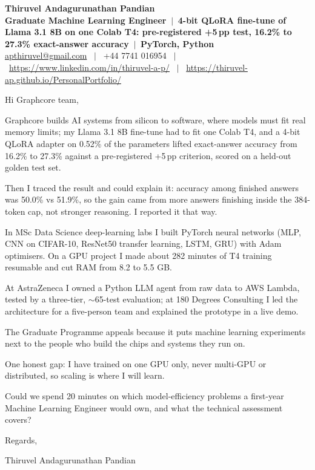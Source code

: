 \documentclass[11pt,a4paper]{article}
\begin{document}
\raggedright
\pagestyle{empty}

\begin{center}
    {\LARGE \color{linkblue} \textbf{Thiruvel Andagurunathan Pandian}}\\[0.2cm]
     {\color{headernavy}\small\textbf{Graduate Machine Learning Engineer \,$|$\, 4-bit QLoRA fine-tune of Llama 3.1 8B on one Colab T4: pre-registered +5\,pp test, 16.2\% to 27.3\% exact-answer accuracy \,$|$\, PyTorch, Python}}\\[0.2cm]
    \href{mailto:apthiruvel@gmail.com}{apthiruvel@gmail.com} \ $|$ \ +44 7741 016954 \ $|$ \
    \url{https://www.linkedin.com/in/thiruvel-a-p/} \ $|$ \
    \url{https://thiruvel-ap.github.io/PersonalPortfolio/}
\end{center}

\vspace{0.4cm}

\noindent
Hi Graphcore team,

Graphcore builds AI systems from silicon to software, where models must fit real memory limits; my Llama 3.1 8B fine-tune had to fit one Colab T4, and a 4-bit QLoRA adapter on 0.52\% of the parameters lifted exact-answer accuracy from 16.2\% to 27.3\% against a pre-registered +5\,pp criterion, scored on a held-out golden test set.

Then I traced the result and could explain it: accuracy among finished answers was 50.0\% vs 51.9\%, so the gain came from more answers finishing inside the 384-token cap, not stronger reasoning. I reported it that way.

In MSc Data Science deep-learning labs I built PyTorch neural networks (MLP, CNN on CIFAR-10, ResNet50 transfer learning, LSTM, GRU) with Adam optimisers. On a GPU project I made about 282 minutes of T4 training resumable and cut RAM from 8.2 to 5.5 GB.

At AstraZeneca I owned a Python LLM agent from raw data to AWS Lambda, tested by a three-tier, $\sim$65-test evaluation; at 180 Degrees Consulting I led the architecture for a five-person team and explained the prototype in a live demo.

The Graduate Programme appeals because it puts machine learning experiments next to the people who build the chips and systems they run on.

One honest gap: I have trained on one GPU only, never multi-GPU or distributed, so scaling is where I will learn.

Could we spend 20 minutes on which model-efficiency problems a first-year Machine Learning Engineer would own, and what the technical assessment covers?

\vspace{0.5cm}

Regards,

Thiruvel Andagurunathan Pandian
\end{document}
